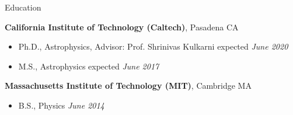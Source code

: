 \documentclass{resume} %
\begin{document}

\begin{rSection}{Education}

{\bf California Institute of Technology (Caltech)}, Pasadena CA
\begin{itemize}
\item Ph.D., Astrophysics, 
  Advisor: Prof. Shrinivas Kulkarni \hfill expected {\em June 2020}
\end{itemize}

\begin{itemize}
  \item M.S., Astrophysics \hfill expected {\em June 2017}
\end{itemize}

{\bf Massachusetts Institute of Technology (MIT)}, Cambridge MA
\begin{itemize}
\item B.S., Physics \hfill {\em June 2014}
\end{itemize}

\end{rSection}


\end{document}
